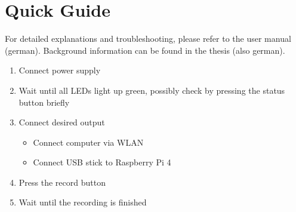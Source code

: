 \documentclass[./00PhotoBox.tex]{subfiles}
\begin{document}
\chapter{Quick Guide}

For detailed explanations and troubleshooting, please refer to the user manual (german). Background information can be found in the thesis (also german).

\begin{enumerate}
    \item Connect power supply
    \item Wait until all LEDs light up green, possibly check by pressing the status button briefly
    \item Connect desired output
          \begin{itemize}
              \item Connect computer via WLAN
              \item Connect USB stick to Raspberry Pi 4
          \end{itemize}
    \item Press the record button
    \item Wait until the recording is finished
\end{enumerate}

\end{document}

